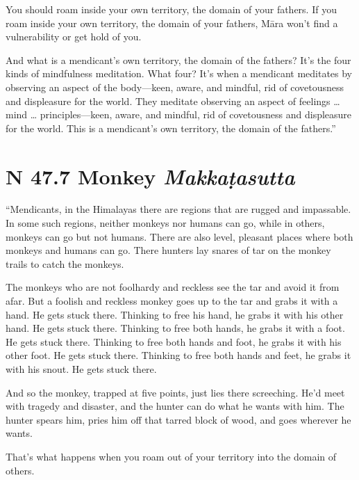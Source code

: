 \documentclass[12pt,openany]{book}%
\newcommand*{\suttatitleacronym}[1]{\smaller[2]{#1}\vspace*{.3em}}
\newcommand*{\suttatitletranslation}[1]{\linebreak{#1}}
\newcommand*{\suttatitleroot}[1]{\linebreak\smaller[2]\itshape{#1}}
\newcommand*{\tocacronym}[1]{\hspace*{-3.3em}{#1}\quad}
\newcommand*{\toctranslation}[1]{#1}
\newcommand*{\tocroot}[1]{(\textit{#1})}
\begin{document}
You should roam inside your own territory, the domain of your fathers. If you roam inside your own territory, the domain of your fathers, \textsanskrit{Māra} won’t find a vulnerability or get hold of you. 

And what is a mendicant’s own territory, the domain of the fathers? It’s the four kinds of mindfulness meditation. What four? It’s when a mendicant meditates by observing an aspect of the body—keen, aware, and mindful, rid of covetousness and displeasure for the world. They meditate observing an aspect of feelings … mind … principles—keen, aware, and mindful, rid of covetousness and displeasure for the world. This is a mendicant’s own territory, the domain of the fathers.” 

%
\section*{{\suttatitleacronym SN 47.7}{\suttatitletranslation A Monkey }{\suttatitleroot Makkaṭasutta}}
\addcontentsline{toc}{section}{\tocacronym{SN 47.7} \toctranslation{A Monkey } \tocroot{Makkaṭasutta}}

“Mendicants, in the Himalayas there are regions that are rugged and impassable. In some such regions, neither monkeys nor humans can go, while in others, monkeys can go but not humans. There are also level, pleasant places where both monkeys and humans can go. There hunters lay snares of tar on the monkey trails to catch the monkeys. 

The monkeys who are not foolhardy and reckless see the tar and avoid it from afar. But a foolish and reckless monkey goes up to the tar and grabs it with a hand. He gets stuck there. Thinking to free his hand, he grabs it with his other hand. He gets stuck there. Thinking to free both hands, he grabs it with a foot. He gets stuck there. Thinking to free both hands and foot, he grabs it with his other foot. He gets stuck there. Thinking to free both hands and feet, he grabs it with his snout. He gets stuck there. 

And so the monkey, trapped at five points, just lies there screeching. He’d meet with tragedy and disaster, and the hunter can do what he wants with him. The hunter spears him, pries him off that tarred block of wood, and goes wherever he wants. 

That’s what happens when you roam out of your territory into the domain of others. 
\end{document}
